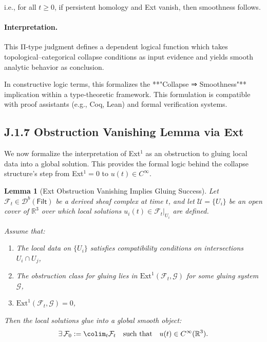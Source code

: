 \documentclass[11pt]{article}
\newtheorem{lemma}[theorem]{Lemma}
\theoremstyle{definition}
\begin{document}
i.e., for all \( t \geq 0 \),  
if persistent homology and Ext vanish, then smoothness follows.

\paragraph{Interpretation.}
This Π-type judgment defines a dependent logical function which takes topological–categorical collapse conditions  
as input evidence and yields smooth analytic behavior as conclusion.

In constructive logic terms, this formalizes the **"Collapse ⇒ Smoothness"** implication within a type-theoretic framework.  
This formulation is compatible with proof assistants (e.g., Coq, Lean) and formal verification systems.

\subsection*{J.1.7 Obstruction Vanishing Lemma via Ext}

We now formalize the interpretation of Ext$^1$ as an obstruction to gluing local data into a global solution.  
This provides the formal logic behind the collapse structure's step from Ext$^1 = 0$ to \( u(t) \in C^\infty \).

\begin{lemma}[Ext Obstruction Vanishing Implies Gluing Success]
\label{lem:ext_obstruction}
Let \( \mathcal{F}_t \in \mathcal{D}^b(\mathsf{Filt}) \) be a derived sheaf complex at time \( t \),  
and let \( \mathcal{U} = \{ U_i \} \) be an open cover of \( \mathbb{R}^3 \) over which local solutions  
\( u_i(t) \in \mathcal{F}_t|_{U_i} \) are defined.  

Assume that:
\begin{enumerate}
    \item The local data on \( \{ U_i \} \) satisfies compatibility conditions on intersections \( U_i \cap U_j \),
    \item The obstruction class for gluing lies in \( \mathrm{Ext}^1(\mathcal{F}_t, \mathcal{G}) \) for some gluing system \( \mathcal{G} \),
    \item \( \mathrm{Ext}^1(\mathcal{F}_t, \mathcal{G}) = 0 \),
\end{enumerate}
Then the local solutions glue into a global smooth object:  
\[
\exists\, \mathcal{F}_0 := \colim_t \mathcal{F}_t \quad \text{such that} \quad u(t) \in C^\infty(\mathbb{R}^3).
\]
\end{lemma}
\end{document}
